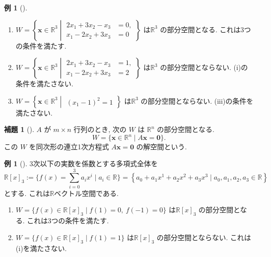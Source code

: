\documentclass[dvipdfmx,a4paper,11pt]{article} %
\newcommand{\R}{\mathbb{R}}
\theoremstyle{definition}
\newtheorem{lem}[thm]{補題}
\newtheorem{eg}[thm]{例}
\begin{document}
\begin{eg}[{\cite[例題4.1.2]{M}}]
\text{}
\begin{enumerate}
\item
\(
W=
\left\{
\bm{x}\in\mathbb{R}^3
\mathrel{}\middle|\mathrel{}
\begin{aligned}
2x_1+3x_2-x_3&=0,\\
x_1-2x_2+3x_3&=0
\end{aligned}
\right\}
\)
は$\mathbb{R}^3$ の部分空間となる. これは3つの条件を満たす. 
\item
\(
W=
\left\{
\bm{x}\in\mathbb{R}^3
\mathrel{}\middle|\mathrel{}
\begin{aligned}
2x_1+3x_2-x_3&=1,\\
x_1-2x_2+3x_3&=2
\end{aligned}
\right\}
\)
は$\mathbb{R}^3$ の部分空間とならない. (i)の条件を満たさない.
\item
\(
W=
\left\{
\bm{x}\in\mathbb{R}^3
\mathrel{}\middle|\mathrel{}
\begin{aligned}
(x_1-1)^2=1
\end{aligned}
\right\}
\)
は$\mathbb{R}^3$ の部分空間とならない. (iii)の条件を満たさない.
\end{enumerate}
\end{eg}

\begin{lem}[{\cite[例題4.1.1]{M}}]
$A$ が $m\times n$ 行列のとき, 次の $W$ は $\mathbb{R}^n$ の部分空間となる. 
\[
W=\{\bm{x}\in\mathbb{R}^n\mid A\bm{x}=\bm{0}\}.
\]
この $W$ を同次形の連立1次方程式 $A\bm{x}=\bm{0}$ の解空間という.
\end{lem}


\begin{eg}[{\cite[例題4.1.3]{M}}]
$3$次以下の実数を係数とする多項式全体を
$$
\mathbb{R}[x]_{3}
:=\{ f(x) = \sum_{i=0}^{3} a_i x^i \mid a_i\in \R\}
=
\left\{a_0 + a_1 x^1 + a_2 x^2 + a_3 x^3 \mid a_0, a_1, a_2, a_3 \in \R 
\right\}
$$
とする. これは$\R$ベクトル空間である. 
\begin{enumerate}
\item 
\(
W=\{f(x)\in\mathbb{R}[x]_3\mid f(1)=0,\ f(-1)=0\}
\)
は$\mathbb{R}[x]_{3}$ の部分空間となる. これは3つの条件を満たす. 
\item
\(
W=\{f(x)\in\mathbb{R}[x]_3\mid f(1)=1\}
\)
は$\mathbb{R}[x]_{3}$ の部分空間とならない. これは(i)を満たさない.  
\end{enumerate}
\end{eg}
\end{document}
